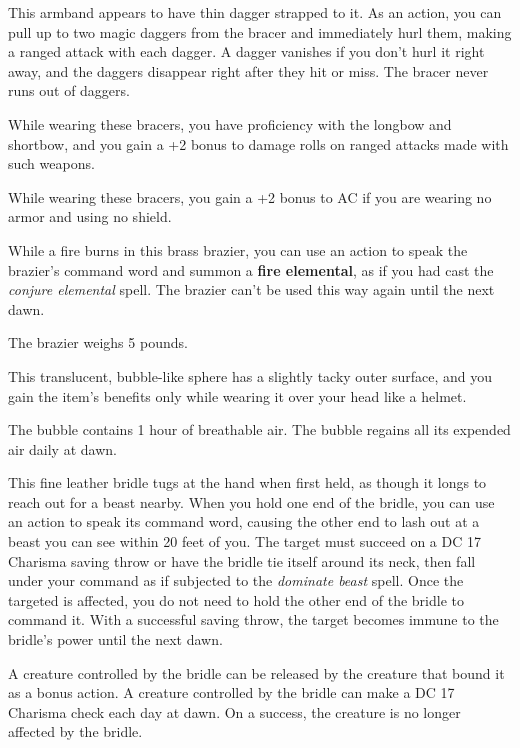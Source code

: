 \documentclass[10pt,a4paper,twoside,bg=print,twocolumn,openany,nodeprecatedcode]{dndbook}
\begin{document}
This armband appears to have thin dagger strapped to it. As an action, you can pull up to two magic daggers from the bracer and immediately hurl them, making a ranged attack with each dagger. A dagger vanishes if you don't hurl it right away, and the daggers disappear right after they hit or miss. The bracer never runs out of daggers.

While wearing these bracers, you have proficiency with the longbow and shortbow, and you gain a +2 bonus to damage rolls on ranged attacks made with such weapons.

While wearing these bracers, you gain a +2 bonus to AC if you are wearing no armor and using no shield.

While a fire burns in this brass brazier, you can use an action to speak the brazier's command word and summon a \textbf{fire elemental}, as if you had cast the \textit{conjure elemental} spell. The brazier can't be used this way again until the next dawn.

The brazier weighs 5 pounds.

This translucent, bubble-like sphere has a slightly tacky outer surface, and you gain the item's benefits only while wearing it over your head like a helmet.

The bubble contains 1 hour of breathable air. The bubble regains all its expended air daily at dawn.

This fine leather bridle tugs at the hand when first held, as though it longs to reach out for a beast nearby. When you hold one end of the bridle, you can use an action to speak its command word, causing the other end to lash out at a beast you can see within 20 feet of you. The target must succeed on a DC 17 Charisma saving throw or have the bridle tie itself around its neck, then fall under your command as if subjected to the \textit{dominate beast} spell. Once the targeted is affected, you do not need to hold the other end of the bridle to command it. With a successful saving throw, the target becomes immune to the bridle's power until the next dawn.

A creature controlled by the bridle can be released by the creature that bound it as a bonus action. A creature controlled by the bridle can make a DC 17 Charisma check each day at dawn. On a success, the creature is no longer affected by the bridle.
\end{document}
